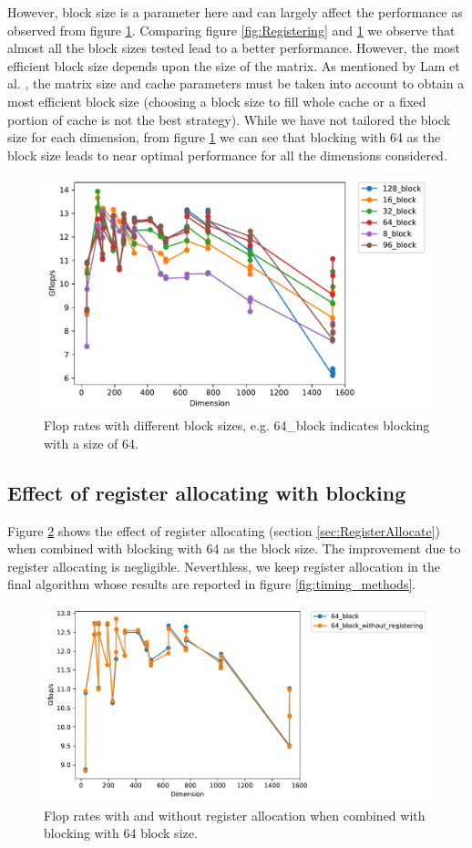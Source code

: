\documentclass{article}
\begin{document}
However, block size is a parameter here and can largely affect the performance as observed from figure \ref{fig:Blocking}. Comparing figure \ref{fig:Registering} and \ref{fig:Blocking} we observe that almost all the block sizes tested lead to a better performance. However, the most efficient block size depends upon the size of the matrix. As mentioned by Lam et al. \footnotemark[\ref{Ref1}], the matrix size and cache parameters must be taken into account to obtain a most efficient block size (choosing a block size to fill whole cache or a fixed portion of cache is not the best strategy). While we have not tailored the block size for each dimension, from figure  \ref{fig:Blocking} we can see that blocking with 64 as the block size leads to near optimal performance for all the dimensions considered.

\begin{figure}[h!]
	\centering
	\includegraphics[width=0.8\columnwidth]{timing_block_size.pdf}
	\caption{Flop rates with different block sizes, e.g. 64\_block indicates blocking with a size of 64.}
	\label{fig:Blocking}
\end{figure}

\subsection{Effect of register allocating with blocking}
Figure \ref{fig:BlockingRegistering} shows the effect of register allocating (section \ref{sec:RegisterAllocate}) when combined with blocking with 64 as the block size. The improvement due to register allocating is negligible. Neverthless, we keep register allocation in the final algorithm whose results are reported in figure \ref{fig:timing_methods}.

\begin{figure}[h!]
	\centering
	\includegraphics[width=0.8\columnwidth]{timing_64_block_registering.pdf}
	\caption{Flop rates with and without register allocation when combined with blocking with 64 block size.}
	\label{fig:BlockingRegistering}
\end{figure}
\end{document}
